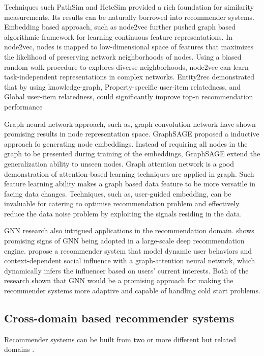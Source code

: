 Techniques such PathSim \citep{Sun2011PathSim} and HeteSim \citep{Shi2013HeteSim} provided a rich foundation for similarity measurements. Its results can be naturally borrowed into recommender systems. 
Embedding based approach, such as node2vec \citep{grover2016node2vec} further pushed graph based algorithmic framework for learning continuous feature representations. In node2vec, nodes is mapped to low-dimensional space of features that maximizes the likelihood of preserving network neighborhoods of nodes. Using a biased random walk procedure to explores diverse neighborhoods, node2vec can learn task-independent representations in complex networks. 
Entity2rec \citep{palumbo2017entity2rec} demonstrated that by using knowledge-graph, Property-specific user-item relatedness, and Global user-item relatedness, could significantly improve top-n recommendation performance

Graph neural network approach, such as, graph convolution network \citep{kipf2016semi} have shown promising results in node representation space. 
GraphSAGE \citep{hamilton2017inductive} proposed a inductive approach fo generating node embeddings. Instead of requiring all nodes in the graph to be presented during training of the embeddings, GraphSAGE extend the generalization ability to unseen nodes. 
Graph attention network \citep{lee2018graph} is a good demonstration of attention-based learning techniques are applied in graph. Such feature learning ability makes a graph based data feature to be more versatile in facing data changes. 
Techniques, such as, user-guided embedding, can be invaluable for catering to optimise recommendation problem and effectively reduce the data noise problem by exploiting the signals residing in the data.

GNN research also intrigued applications in the recommendation domain. \citet{ying2018graph} shows promising signs of GNN being adopted in a large-scale deep recommendation engine. \citet{song2019session} propose a recommender system that model dynamic user behaviors and context-dependent social influence with a graph-attention neural network, which dynamically infers the influencer based on users’ current interests. Both of the research shown that GNN would be a promising approach for making the recommender systems more adaptive and capable of handling cold start problems.

\subsection{Cross-domain based recommender systems}
Recommender systems can be built from two or more different but related domains \citep{fernandez2012cross}.

